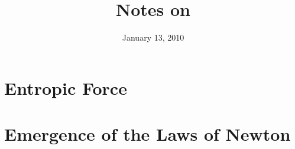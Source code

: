 \documentclass{article}
\title{Notes on \arXiv[hep-th]{1001.0785v1}}
\date{January 13, 2010}
\begin{document}
\maketitle
\tableofcontents

\section{Entropic Force}


\section{Emergence of the Laws of Newton}


\pagebreak
\nocite{*}


\end{document}
